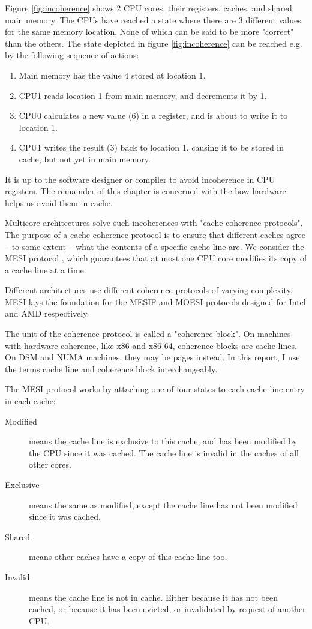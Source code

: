 Figure \ref{fig:incoherence} shows 2 CPU cores, their registers, caches, and
shared main memory. The CPUs have reached a state where there are 3 different
values for the same memory location. None of which can be said to be more
"correct" than the others.
The state depicted in figure \ref{fig:incoherence} can be reached e.g. by the
following sequence of actions:

\begin{enumerate}
	\item Main memory has the value 4 stored at location 1.
	\item CPU1 reads location 1 from main memory, and decrements it by 1.
	\item CPU0 calculates a new value (6) in a register, and is about to
		write it to location 1.
	\item CPU1 writes the result (3) back to location 1, causing it to be
		stored in cache, but not yet in main memory.
\end{enumerate}

It is up to the software designer or compiler to avoid incoherence in CPU
registers. The remainder of this chapter is concerned with the how hardware
helps us avoid them in cache.

Multicore architectures solve such incoherences with "cache coherence
protocols". The purpose of a cache coherence protocol is to ensure that different
caches agree -- to some extent -- what the contents of a specific cache line
are. We consider the MESI protocol \cite{mesi,mckenny-barriers}, which
guarantees that at most one CPU core modifies its copy of a cache line at a
time.

Different architectures use different coherence protocols
of varying complexity.
MESI lays the foundation for the MESIF and MOESI protocols designed for Intel
and AMD respectively.

The unit of the coherence protocol is called a "coherence block". On machines
with hardware coherence, like x86 and x86-64, coherence blocks
are cache lines. On DSM and NUMA machines, they may be pages
instead\cite{falsedef}.
In this report, I use the terms cache line and coherence block interchangeably.

The MESI protocol works by attaching one of four states to each cache line
entry in each cache:

\begin{description}
\item[Modified] means the cache line is exclusive to this cache, and has been
modified by the CPU since it was cached. The cache line is invalid in the caches of all other cores.
\item[Exclusive] means the same as modified, except the cache line has not been modified since it was cached.
\item[Shared] means other caches have a copy of this cache line too.
\item[Invalid] means the cache line is not in cache. Either because it has not
been cached, or because it has been evicted, or invalidated by request of another CPU.
\end{description}

